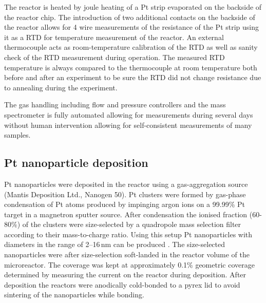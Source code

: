 \documentclass[8.5pt,twoside,twocolumn]{article}
\begin{document}
The reactor is heated by joule heating of a Pt strip evaporated on the backside of the reactor chip. The introduction of two additional contacts on the backside of the reactor allows for 4 wire measurements of the resistance of the Pt strip using it as a RTD for temperature measurement of the reactor. An external thermocouple acts as room-temperature calibration of the RTD as well as sanity check of the RTD measurement during operation. The measured RTD temperature is always compared to the thermocouple at room temperature both before and after an experiment to be sure the RTD did not change resistance due to annealing during the experiment.

The gas handling including flow and pressure controllers and the mass spectrometer is fully automated allowing for measurements during several days without human intervention allowing for self-consistent measurements of many samples.

\subsection{Pt nanoparticle deposition}
Pt nanoparticles were deposited in the reactor using a gas-aggregation source (Mantis Deposition Ltd., Nanogen 50). Pt clusters were formed by gas-phase condensation of Pt atoms produced by impinging argon ions on a 99.99\% Pt target in a magnetron sputter source. After condensation the ionised fraction (60-80\%) of the clusters were size-selected by a quadropole mass selection filter according to their mass-to-charge ratio. Using this setup Pt nanoparticles with diameters in the range of 2--16\,nm can be produced \cite{Nielsen2010,Nielsen2009}. The size-selected nanoparticles were after size-selection soft-landed in the reactor volume of the microreactor. The coverage was kept at approximately 0.1\% geometric coverage determined by measuring the current on the reactor during deposition. After deposition the reactors were anodically cold-bonded \cite{Vesborg2010} to a pyrex lid to avoid sintering of the nanoparticles while bonding.
\end{document}
